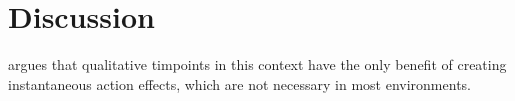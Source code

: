 \section{Discussion}\label{sec:discussion}


\cite{bit-monnotTemporalHierarchicalModels2017} argues that qualitative timpoints in this context have the only benefit of creating instantaneous action effects, which are not necessary in most environments.